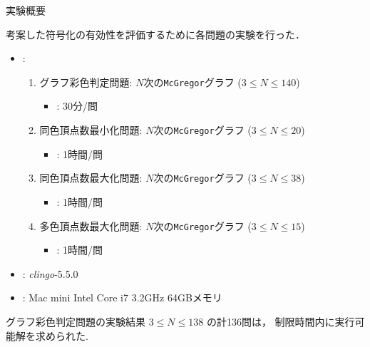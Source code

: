 \documentclass[dvipdfmx,11pt]{beamer}
\newcommand{\code}[1]{\lstinline[basicstyle=\ttfamily]{#1}}
\begin{document}
\begin{frame}{実験概要}
 \begin{block}{}
  考案した符号化の有効性を評価するために各問題の実験を行った．
 \end{block}

\begin{itemize}
 \item {}:
       \begin{enumerate}
        \item グラフ彩色判定問題: $N$次の\code{McGregor}グラフ ($3 \leq N\leq 140$)
              \begin{itemize}
               \item {}: 30分/問
              \end{itemize}
        \item 同色頂点数最小化問題: $N$次の\code{McGregor}グラフ ($3 \leq N\leq 20$)%
              \begin{itemize}
               \item {}: 1時間/問
              \end{itemize}
        \item 同色頂点数最大化問題: $N$次の\code{McGregor}グラフ ($3 \leq N\leq 38$)%
              \begin{itemize}
               \item {}: 1時間/問
              \end{itemize}
        \item 多色頂点数最大化問題: $N$次の\code{McGregor}グラフ ($3 \leq N\leq 15$)%
              \begin{itemize}
               \item {}: 1時間/問
              \end{itemize}
       \end{enumerate}
 \item {}: \textit{clingo}-5.5.0
 \item {}: Mac mini Intel Core i7 3.2GHz 64GBメモリ
\end{itemize}  

 \begin{alertblock}{グラフ彩色判定問題の実験結果}
  $3 \leq N\leq 138$ の計136問は，
  制限時間内に実行可能解を求められた.
 \end{alertblock}
\end{frame}
\end{document}
